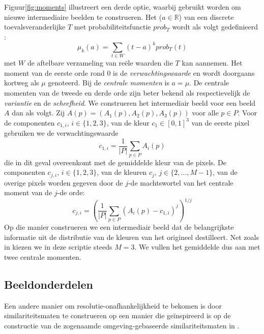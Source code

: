 Figuur\ref{fig:moments} illustreert een derde optie, waarbij  gebruikt
worden om nieuwe intermediaire beelden te construeren. Het  ($a
\in \mathbb{R}$) van een discrete toevalsveranderlijke $T$ met
probabiliteitsfunctie $prob_T$ wordt als volgt gedefinieerd
\cite{demeyer:statistiek}: 
\begin{displaymath}
\mu_k(a) = \sum_{t \in W} (t-a)^k prob_T(t)
\end{displaymath}
met $W$ de aftelbare verzameling van re\"ele waarden die $T$ kan aannemen. Het
moment
van de eerste orde rond $0$ is de \emph{verwachtingswaarde} en wordt doorgaans kortweg als
$\mu$ genoteerd. Bij de \emph{centrale momenten} is $a=\mu$. De centrale 
momenten van de tweede en derde orde zijn beter bekend als respectievelijk de
\emph{variantie} en de \emph{scheefheid}. We construeren het intermediair beeld
voor een beeld $A$ dan als volgt. Zij $A(p)=(A_1(p),A_2(p),A_3(p))$ voor
alle $p \in P$. Voor de componenten $c_{1,i}$, $i \in \{1,2,3\}$, van de
kleur $c_1 \in [0,1]^3$ van de eerste pixel gebruiken we de verwachtingswaarde
\begin{displaymath}
c_{1,i} = \frac{1}{|P|} \sum_{p \in P} A_i(p)  
\end{displaymath}
die in dit geval overeenkomt met de gemiddelde kleur van de pixels.
De componenten $c_{j,i}$, $i \in \{1,2,3\}$, van de kleuren $c_j$, $j \in
\{2,\ldots,M-1\}$, van de overige pixels worden gegeven door de $j$-de
machtswortel van het centrale moment van de $j$-de orde:
\begin{displaymath}
c_{j,i} = \left( \frac{1}{|P|} \sum_{p \in P} (A_i(p) - c_{1,i})^j \right)^{1/j}
\end{displaymath}
Op die manier construeren we een intermediair beeld dat de
belangrijkste informatie uit de distributie van de kleuren van het origineel
destilleert. Net zoals in \cite{stricker:similarity_of_color_images} kiezen we 
in deze scriptie steeds $M = 3$. We vullen het gemiddelde dus aan met twee
centrale momenten.

\subsection{Beeldonderdelen}

Een andere manier om resolutie-onafhankelijkheid te bekomen is door similariteitsmaten te construeren 
op een manier die ge\"inspireerd is op de constructie van de zogenaamde omgeving-gebaseerde 
similariteitsmaten in \cite{vanderweken:similariteitsmaten}. 

